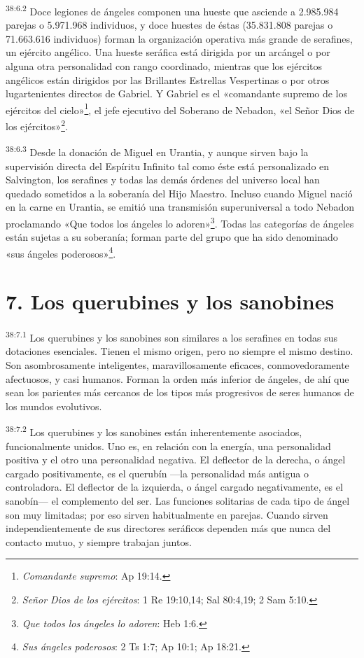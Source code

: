 \par
\textsuperscript{38:6.2} Doce legiones de ángeles componen una hueste que asciende a
2.985.984 parejas o 5.971.968 individuos, y doce huestes de éstas (35.831.808 parejas o 71.663.616 individuos) forman la organización operativa más grande de serafines, un ejército angélico. Una hueste seráfica está dirigida por un arcángel o por alguna otra personalidad con rango coordinado, mientras que los ejércitos angélicos están dirigidos por las Brillantes Estrellas Vespertinas o por otros lugartenientes directos de Gabriel. Y Gabriel es el «comandante supremo de los ejércitos del cielo»\footnote{\textit{Comandante supremo}: Ap 19:14.}, el jefe ejecutivo del Soberano de Nebadon, «el Señor Dios de los ejércitos»\footnote{\textit{Señor Dios de los ejércitos}: 1 Re 19:10,14; Sal 80:4,19; 2 Sam 5:10.}.

\par
\textsuperscript{38:6.3} Desde la donación de Miguel en Urantia, y aunque sirven bajo la supervisión directa del Espíritu Infinito tal como éste está personalizado en Salvington, los serafines y todas las demás órdenes del universo local han quedado sometidos a la soberanía del Hijo Maestro. Incluso cuando Miguel nació en la carne en Urantia, se emitió una transmisión superuniversal a todo Nebadon proclamando «Que todos los ángeles lo adoren»\footnote{\textit{Que todos los ángeles lo adoren}: Heb 1:6.}. Todas las categorías de ángeles están sujetas a su soberanía; forman parte del grupo que ha sido denominado «sus ángeles poderosos»\footnote{\textit{Sus ángeles poderosos}: 2 Ts 1:7; Ap 10:1; Ap 18:21.}.

\section*{7. Los querubines y los sanobines}
\par
\textsuperscript{38:7.1} Los querubines y los sanobines son similares a los serafines en todas sus dotaciones esenciales. Tienen el mismo origen, pero no siempre el mismo destino. Son asombrosamente inteligentes, maravillosamente eficaces, conmovedoramente afectuosos, y casi humanos. Forman la orden más inferior de ángeles, de ahí que sean los parientes más cercanos de los tipos más progresivos de seres humanos de los mundos evolutivos.

\par
\textsuperscript{38:7.2} Los querubines y los sanobines están inherentemente asociados, funcionalmente unidos. Uno es, en relación con la energía, una personalidad positiva y el otro una personalidad negativa. El deflector de la derecha, o ángel cargado positivamente, es el querubín ---la personalidad más antigua o controladora. El deflector de la izquierda, o ángel cargado negativamente, es el sanobín--- el complemento del ser. Las funciones solitarias de cada tipo de ángel son muy limitadas; por eso sirven habitualmente en parejas. Cuando sirven independientemente de sus directores seráficos dependen más que nunca del contacto mutuo, y siempre trabajan juntos.

